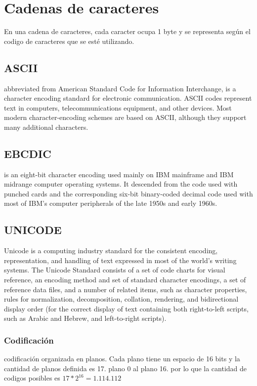 \section{Cadenas de caracteres}

En una cadena de caracteres, cada caracter ocupa 1 byte y se representa según el codigo de caracteres que se esté utilizando.

\subsection{ASCII}
abbreviated from American Standard Code for Information Interchange, is a character encoding standard for electronic communication. ASCII codes represent text in computers, telecommunications equipment, and other devices. Most modern character-encoding schemes are based on ASCII, although they support many additional characters.

\subsection{EBCDIC}
is an eight-bit character encoding used mainly on IBM mainframe and IBM midrange computer operating systems. It descended from the code used with punched cards and the corresponding six-bit binary-coded decimal code used with most of IBM's computer peripherals of the late 1950s and early 1960s.

\subsection{UNICODE}
Unicode is a computing industry standard for the consistent encoding, representation, and handling of text expressed in most of the world's writing systems. The Unicode Standard consists of a set of code charts for visual reference, an encoding method and set of standard character encodings, a set of reference data files, and a number of related items, such as character properties, rules for normalization, decomposition, collation, rendering, and bidirectional display order (for the correct display of text containing both right-to-left scripts, such as Arabic and Hebrew, and left-to-right scripts).

\subsubsection{Codificación}
codificación organizada en planos. Cada plano tiene un espacio de 16 bits y la cantidad de planos definida es 17. plano 0 al plano 16. por lo que la cantidad de codigos posibles es $17*2^{16} = 1.114.112$

